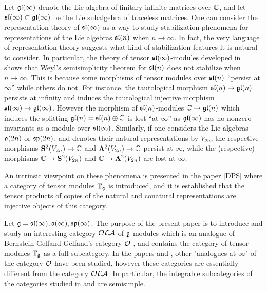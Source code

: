 \documentclass[12pt]{amsart}
\makeatletter
\def\mathbb{\Bbb}
\def\mathfrak{\frak}
\def\mathcal{\cal}
\def\@putname#1#2#3#4{\def\@@ref{#3}\let\old@bf\bf
        \def\bf##1{\old@bf\if?\noexpand##1?{#4}\else##1\fi}%
        #1{#2}%
        \let\bf\old@bf}
\def\@putname#1#2#3#4{\def\@@ref{#3}\let\old@bf\bf    %
        \let\old@reset@font\reset@font                  %
        \def\bf##1{\old@bf\if?\noexpand##1?{#4}\else##1\fi}%
        \def\reset@font##1##2{\old@reset@font##1\if?\noexpand##2?{#4}\else##2\fi}#1{#2}%
        \let\bf\old@bf\let\reset@font\old@reset@font}
\let\my@cite=\cite
\def\cite#1{\@putname\my@cite{#1}{\@citeb}{\tiny\rm\@@ref}}
\theoremstyle{plain} %
\numberwithin{equation}{section}
\theoremstyle{definition}
\theoremstyle{remark}
\theoremstyle{plain} %
\makeatother
\begin{document}
	Let  $\mathfrak{gl}(\infty)$ denote the Lie algebra of finitary infinite matrices over $\mathbb{C}$, and let $\mathfrak{sl}(\infty)\subset\mathfrak{gl}(\infty)$ be the Lie subalgebra of traceless matrices.  One can consider the representation theory of $\mathfrak{sl}(\infty)$ as a way to study stabilization phenomena for representations of the Lie algebras $\mathfrak{sl}(n)$ when $n\to\infty$.  In fact, the very language of representation theory suggests what kind of stabilization features it is natural to consider.  In particular, the theory of tensor $\mathfrak{sl}(\infty)$-modules developed in~\cite{PStyr} shows that Weyl's semisimplicity theorem for $\mathfrak{sl}(n)$ does not stabilize when $n\to\infty$.	 This is because some morphisms of tensor modules over $\mathfrak{sl}(n)$ ``persist at $\infty$'' while others do not.  For instance, the tautological morphism $\mathfrak{sl}(n)\to \mathfrak{gl}(n)$ persists at infinity and induces the tautological injective morphism $\mathfrak{sl}(\infty)\to \mathfrak{gl}(\infty)$. However the morphism of  $\mathfrak{sl}(n)$-modules $\mathbb{C}\to\mathfrak{gl}(n)$ which induces the splitting $\mathfrak{gl}(n)=\mathfrak{sl}(n)\oplus\mathbb{C}$ is lost ``at $\infty$''  as $\mathfrak{gl}(\infty)$ has no nonzero invariants as a module over $\mathfrak{sl}(\infty)$. Similarly, if one considers the Lie algebras $\mathfrak{o}(2n)$ or $\mathfrak{sp}(2n)$, and denotes their natural representations by $V_{2n}$, the respective morphisms ${\bf S}^2(V_{2n})\to \mathbb{C}$ and ${\bf\Lambda}^2(V_{2n})\to \mathbb{C}$ persist at $\infty$, while the (respective) morphisms $\mathbb{C}\to {\bf S}^2(V_{2n})$ and $\mathbb{C}\to {\bf\Lambda}^2(V_{2n})$ are lost at $\infty$.

An intrinsic viewpoint on these phenomena is presented in the  paper [DPS] where a category of tensor modules $\mathbb{T}_{\mathfrak{g}}$ is introduced, and it is established that the tensor products of copies of the natural and conatural representations are injective objects of this category.
	
	Let $\mathfrak{g}=\mathfrak{sl}(\infty), \mathfrak{o}(\infty), \mathfrak{sp}(\infty)$. The purpose of the present paper is to introduce and study an interesting category $\mathcal{OLA}$ of $\mathfrak{g}$-modules which is an analogue of Bernstein-Gelfand-Gelfand's category $\mathcal{O}$ \cite{BGG}, and contains the category of tensor modules $\mathbb{T}_{\mathfrak{g}}$ as a full subcategory. In the papers \cite{Nam} and \cite{CP}, other "analogues at $\infty$" of the category $\mathcal{O}$ have been studied, however these categories are essentially different from the category $\mathcal{OLA}$. In particular, the integrable subcategories of the categories studied in \cite{Nam} and \cite{CP} are semisimple.
	
\end{document}

